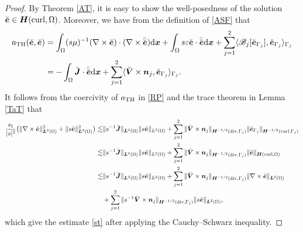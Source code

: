 \documentclass[11pt,reqno]{amsart}
\numberwithin{equation}{section}
\begin{document}
\begin{proof}
By Theorem \ref{AT}, it is easy to show the well-posedness of  the solution
$\breve {\boldsymbol e} \in \boldsymbol H ({\rm curl}, \Omega)$. 
Moreover, we have from the definition of \eqref{ASF} that 
\begin{align*}
a_{\rm TH} (\breve {\boldsymbol e}, \breve {\boldsymbol e})
&=\int_{\Omega} ( s \mu )^{-1} (\nabla \times \breve {\boldsymbol e}) \cdot
(\nabla \times \bar {\breve {\boldsymbol e}}){\rm d} \boldsymbol x
+\int_{\Omega} s \varepsilon \breve {\boldsymbol e} \cdot \bar {\breve
{\boldsymbol e}} {\rm d} \boldsymbol x +\sum\limits_{j=1}^2 \langle \mathscr B_j
[\breve {\boldsymbol e}_{\Gamma_j}], \breve {\boldsymbol e}_{\Gamma_j}
\rangle_{\Gamma_j}\\
&=-\int_{\Omega} \breve {\boldsymbol J} \cdot \bar {\breve {\boldsymbol e}} {\rm
d} \boldsymbol x+ \sum \limits_{j=1}^{2} \langle \breve {\boldsymbol V} \times
\boldsymbol n_j, \breve {\boldsymbol e}_{\Gamma_j} \rangle_{\Gamma_j}.
\end{align*}
It follows from the coercivity of $a_{\rm TH}$ in \eqref{RP} and the trace
theorem in Lemma \ref{TaT} that 
\begin{align*}
\frac{s_1}{|s|^2} \big(  \|\nabla \times \breve {\boldsymbol e}\|^2_{\boldsymbol
L^2 (\Omega)} +\|s \breve {\boldsymbol e}\|^2_{\boldsymbol L^2 (\Omega)} \big)
\lesssim &\|s^{-1} \breve {\boldsymbol J}\|_{\boldsymbol L^2 (\Omega)} \|s
\breve {\boldsymbol e}\|_{L^2 (\Omega)}+
\sum\limits_{j=1}^2 \|\breve {\boldsymbol V} \times \boldsymbol n_j\|_{\boldsymbol H^{-1/2} ({\rm div},  \Gamma_j)}
\| \breve {\boldsymbol e}_{\Gamma_j}\|_{\boldsymbol H^{-1/2} ({\rm curl}, \Gamma_j)}\\
\lesssim &\|s^{-1} \breve {\boldsymbol J}\|_{\boldsymbol L^2 (\Omega)} \|s
\breve {\boldsymbol e}\|_{L^2 (\Omega)}+
\sum\limits_{j=1}^2 \|\breve {\boldsymbol V} \times \boldsymbol n_j\|_{\boldsymbol H^{-1/2} ({\rm div},  \Gamma_j)}
\|\breve {\boldsymbol e}\|_{\boldsymbol H ({\rm curl}, \Omega)}\\
\lesssim &\|s^{-1} \breve {\boldsymbol J}\|_{\boldsymbol L^2 (\Omega)} \|s
\breve {\boldsymbol e}\|_{L^2 (\Omega)}
+\sum\limits_{j=1}^2 \|\breve {\boldsymbol V} \times \boldsymbol n_j\|_{\boldsymbol H^{-1/2} ({\rm div},  \Gamma_j)}
\|\nabla \times  \breve {\boldsymbol e} \|_{\boldsymbol L^2 (\Omega)}\\
&+\sum\limits_{j=1}^2 \|s ^{-1}\breve {\boldsymbol V} \times \boldsymbol n_j\|_{\boldsymbol H^{-1/2} ({\rm div},  \Gamma_j)}
\|s \breve {\boldsymbol e}\|_{\boldsymbol L^2 (\Omega)},
\end{align*}
which give the estimate \eqref{st} after applying the Cauchy--Schwarz
inequality.
\end{proof}
\end{document}
